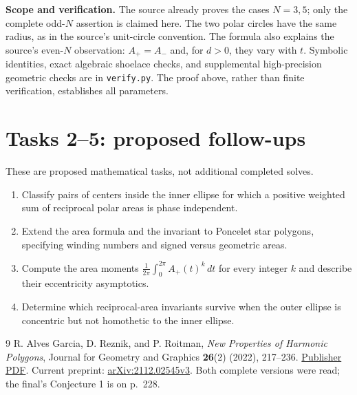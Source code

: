 \documentclass[11pt]{article}
\begin{document}
\noindent\textbf{Scope and verification.}
The source already proves the cases $N=3,5$; only the complete odd-$N$
assertion is claimed here. The two polar circles have the same radius,
as in the source's unit-circle convention. The formula also explains the
source's even-$N$ observation: $A_+=A_-$ and, for $d>0$, they vary with
$t$. Symbolic identities, exact algebraic shoelace checks, and supplemental
high-precision geometric checks are in \texttt{verify.py}. The proof above,
rather than finite verification, establishes all parameters.

\section*{Tasks 2--5: proposed follow-ups}
These are proposed mathematical tasks, not additional completed solves.
\begin{enumerate}[label=\textbf{Task \arabic*.},start=2,leftmargin=*]
\item Classify pairs of centers inside the inner ellipse for which a
positive weighted sum of reciprocal polar areas is phase independent.
\item Extend the area formula and the invariant to Poncelet star polygons,
specifying winding numbers and signed versus geometric areas.
\item Compute the area moments $\frac1{2\pi}\int_0^{2\pi}A_+(t)^k\,dt$
for every integer $k$ and describe their eccentricity asymptotics.
\item Determine which reciprocal-area invariants survive when the outer
ellipse is concentric but not homothetic to the inner ellipse.
\end{enumerate}

\begin{thebibliography}{9}
 R. Alves Garcia, D. Reznik, and P. Roitman,
\emph{New Properties of Harmonic Polygons}, Journal for Geometry and
Graphics \textbf{26}(2) (2022), 217--236.
\href{https://www.heldermann-verlag.de/jgg/jgg26/j26h2alve.pdf}{Publisher PDF}.
Current preprint: \href{https://arxiv.org/abs/2112.02545}{arXiv:2112.02545v3}.
Both complete versions were read; the final's Conjecture 1 is on p.~228.
\end{thebibliography}
\end{document}

